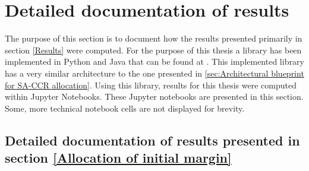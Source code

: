 \documentclass[../Thesis_AHoecherl.tex]{subfiles}
\begin{document}
    \chapter{Detailed documentation of results}\label{Detailed documentation of results}
    The purpose of this section is to document how the results presented primarily in section \ref{Results} were computed.
    For the purpose of this thesis a library has been implemented in Python and Java that can be found at \cite{Hoecherl2020}.
    This implemented library has a very similar architecture to the one presented in \ref{sec:Architectural blueprint for SA-CCR allocation}.
    Using this library, results for this thesis were computed within Jupyter Notebooks. These Jupyter notebooks are presented in this section. 
    Some, more technical notebook cells are not displayed for brevity.  


    \section{Detailed documentation of results presented in section \ref{Allocation of initial margin}}

    

    
    
    

    
\end{document}
